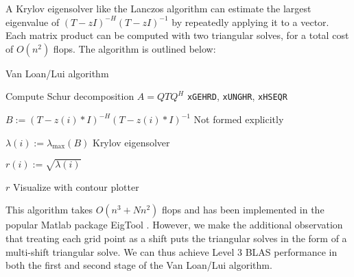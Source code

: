 \documentclass{article}
\begin{document}
A Krylov eigensolver like the Lanczos algorithm can estimate the
largest eigenvalue of \(\left( T-zI \right)^{-H} \left( T-zI
\right)^{-1}\) by repeatedly applying it to a vector. Each matrix
product can be computed with two triangular solves, for a total cost
of \(O(n^2)\) flops. The algorithm is outlined below:
\begin{algorithm}[H]
  \label{algorithm:van loan/lui}
  \caption{Van Loan/Lui algorithm}
  \begin{algorithmic}

    \State Compute Schur decomposition \(A=Q T Q^H\) \Comment \texttt{xGEHRD}, \texttt{xUNGHR}, \texttt{xHSEQR}
    

    \State \(B := \left(T-z(i)*I\right)^{-H} \left(T-z(i)*I\right)^{-1}\)
    \Comment Not formed explicitly

    \State \(\lambda(i) := \lambda_\text{max}\left( B \right)\)
    \Comment Krylov eigensolver

    \State \(r(i) := \sqrt{\lambda(i)}\)

    \EndFor

    \State \Return \(r\) \Comment Visualize with contour plotter

    \EndFunction
  \end{algorithmic}
\end{algorithm}
\noindent
This algorithm takes \(O(n^3+Nn^2)\) flops and has been implemented in
the popular Matlab package EigTool \cite{wright2002eigtool}. However,
we make the additional observation that treating each grid point as a
shift puts the triangular solves in the form of a multi-shift
triangular solve. We can thus achieve Level 3 BLAS performance in both
the first and second stage of the Van Loan/Lui algorithm.
\end{document}
